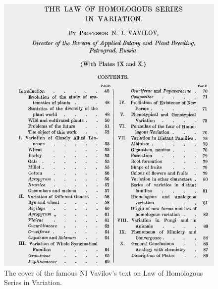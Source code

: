 \documentclass[11pt,ignorenonframetext,aspectratio=169]{beamer}
\newif\ifbibliography
\begin{document}
\begin{frame}{}
\protect\hypertarget{section-14}{}
\begin{figure}

{\centering \includegraphics[width=0.45\linewidth]{./images/law_of_homologous_series_variation} 

}

\caption{The cover of the famous NI Vavilov's text on Law of Homologous Series in Variation. \cite{vavilov1922law}}\label{fig:law-homologous-series-variation}
\end{figure}
\end{frame}

          \begin{frame}[allowframebreaks]{}
    \bibliographytrue
    
    \end{frame}
  
\end{document}
